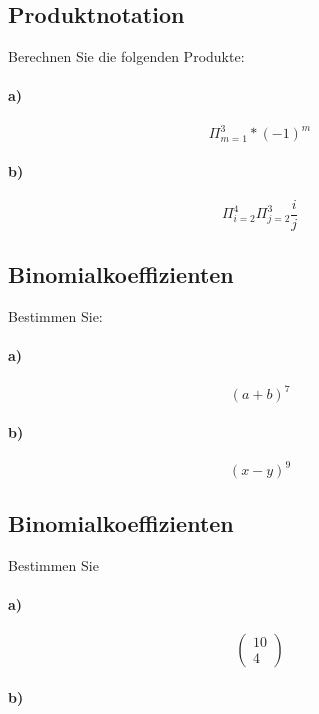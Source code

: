 \documentclass[paper=a4, fontsize=11pt]{scrartcl}
\numberwithin{equation}{section}
\numberwithin{figure}{section}
\numberwithin{table}{section}
\begin{document}
\subsection{Produktnotation}
Berechnen Sie die folgenden Produkte:
\paragraph{a)}
$$\Pi^{3}_{m=1}*(-1)^{m}$$

\paragraph{b)}
$$\Pi^{4}_{i=2} \Pi^{3}_{j=2} \dfrac{i}{j}$$

\subsection{Binomialkoeffizienten}
Bestimmen Sie:
\paragraph{a)}
$$(a+b)^{7}$$

\paragraph{b)}
$$(x-y)^{9}$$

\subsection{Binomialkoeffizienten}
Bestimmen Sie
\paragraph{a)}
$$\left(\begin{array}{c} 10 \\ 4 \end{array}\right)$$

\paragraph{b)}
\end{document}
